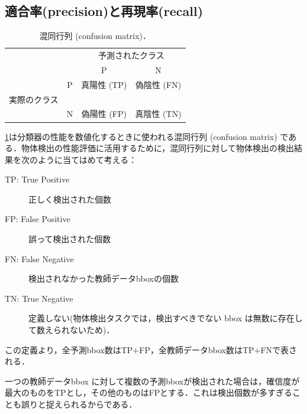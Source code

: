 \documentclass[originalpaper,fleqn]{jsaiart}     %
\begin{document}
\subsection{適合率(precision)と再現率(recall)}
\begin{table}
    \caption{ 混同行列 (confusion matrix)．}
    \label{tbl-confuse}
    \centering
    \begin{tabular}{cc|c|c|} 
        \multicolumn{2}{c}{} & \multicolumn{2}{c}{予測されたクラス} \\ 
        \multicolumn{2}{l}{} & \multicolumn{1}{c}{P} & \multicolumn{1}{c}{N} \\ \cline{3-4}
        \vspace*{-3mm}
         & P & 真陽性 (TP) & 偽陰性 (FN) \\ 
        \vspace*{-2mm}
        実際のクラス\!\!\!\!\!\! &  &  &  \\ \cline{3-4}
         & N  & 偽陽性 (FP) &  真陰性 (TN) \\  \cline{3-4}
    \end{tabular}
\end{table}
\ref{tbl-confuse}は分類器の性能を数値化するときに使われる混同行列 (confusion matrix) である．物体検出の性能評価に活用するために，混同行列に対して物体検出の検出結果を次のように当てはめて考える：
\\
\begin{description}
    \item[TP: True Positive] 正しく検出された個数
    \item[FP: False Positive] 誤って検出された個数
    \item[FN: False Negative] 検出されなかった教師データbboxの個数
    \item[TN: True Negative] 定義しない(物体検出タスクでは，検出すべきでない bbox は無数に存在して数えられないため)．
\end{description}\vspace{4mm}
この定義より，全予測bbox数はTP${+}$FP，全教師データbbox数はTP{+}FNで表される．

一つの教師データbbox に対して複数の予測bboxが検出された場合は，確信度が最大のものをTPとし，その他のものはFPとする．これは検出個数が多すぎることも誤りと捉えられるからである．
\end{document}
